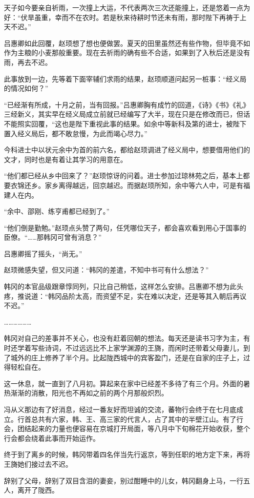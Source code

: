 天子如今要亲自祈雨，一次撞上大运，不代表两次三次还能撞上，还是悠着一点为好：“伏旱虽重，幸而不在农时。若是秋来待耕时节还未有雨，那时陛下再祷于上天不迟。”

吕惠卿如此回覆，赵顼想了想也便做罢。夏天的田里虽然还有些作物，但毕竟不如作为主粮的小麦那般重要。现在去祈雨的确有些不合适，如果到了入秋后还是没有雨，再去不迟。

此事放到一边，先等着下面宰辅们求雨的结果，赵顼顺道问起另一桩事：“经义局的情况如何？”

“已经渐有所成，十月之前，当有回报。”吕惠卿胸有成竹的回道，《诗》《书》《礼》三经新义，其实早在经义局成立前就已经编写了大半，现在只是在修改而已，但话不能照实回覆，“这也是陛下重视此事的结果。如余中等新科及第的进士，被陛下置入经义局后，都不敢怠慢，为此而竭心尽力。”

今科进士中以状元余中为首的前六名，都给赵顼调进了经义局中，想要借用他们的文才，同时也是有着让其学习的用意在。

“他们都已经从乡中回来了？”赵顼惊讶的问着。进士参加过琼林苑之后，基本上都要衣锦还乡。家乡离得越远，回京越迟。而据赵顼所知，余中等六人中，可是有福建人在内。

“余中、邵刚、练亨甫都已经到了。”

“他们倒是勤勉。”赵顼点头赞了两句，任凭哪位天子，都会喜欢看到用心于国事的臣僚。“……那韩冈可曾有消息？”

吕惠卿摇了摇头，“尚无。”

赵顼微感失望，但又问道：“韩冈的差遣，不知中书可有什么想法？”

韩冈的本官品级跟章惇同列，只比自己稍低，这样怎么安排。吕惠卿不想为此头疼，推说道：“韩冈品阶太高，而资望不足，实在难以决定，还是等其入朝后再议不迟。”

………………

韩冈对自己的差事并不关心，也没有赶着回朝的想法。每天还是读书习字为主，有时还学着写些诗词，不过远远比不上家学渊源的王旖，而闲时还带着父母妻儿，到了城外的庄上修养了半个月。比起陇西城中的宾客盈门，还是在自家的庄子上，过得轻松自在。

这一休息，就一直到了八月初。算起来在家中已经差不多待了有三个月。外面的暑热渐渐的消散，阳光也不再如之前的两个月那般炽烈。

冯从义那边有了好消息，经过一番友好而坦诚的交流，蕃物行会终于在七月底成立。行首总共有六家，韩、王、高三家的代言人，占了其中的半壁江山。有了行会，团结起来的力量也便容易在京城打开局面，等八月中下旬棉花开始收获，整个行会都会绕着此事而开始运作。

终于到了离乡的时候，韩冈带着四名伴当先行返京，等到任职的地方定下来，再将王旖她们接过去不迟。

辞别了父母，辞别了双目含泪的妻妾，别过酣睡中的儿女，韩冈翻身上马，一行五人，离开了陇西。

